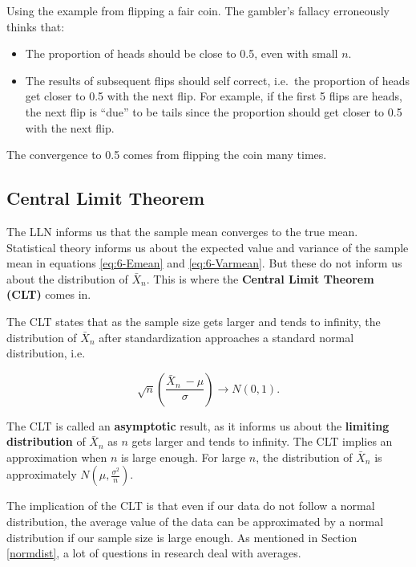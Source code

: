 \documentclass[
]{book}
\providecommand{\tightlist}{%
  \setlength{\itemsep}{0pt}\setlength{\parskip}{0pt}}
\begin{document}
Using the example from flipping a fair coin. The gambler's fallacy erroneously thinks that:

\begin{itemize}
\tightlist
\item
  The proportion of heads should be close to 0.5, even with small \(n\).
\item
  The results of subsequent flips should self correct, i.e.~the proportion of heads get closer to 0.5 with the next flip. For example, if the first 5 flips are heads, the next flip is ``due'' to be tails since the proportion should get closer to 0.5 with the next flip.
\end{itemize}

The convergence to 0.5 comes from flipping the coin many times.

\subsection{Central Limit Theorem}\label{CLT}

The LLN informs us that the sample mean converges to the true mean. Statistical theory informs us about the expected value and variance of the sample mean in equations \eqref{eq:6-Emean} and \eqref{eq:6-Varmean}. But these do not inform us about the distribution of \(\bar{X}_n\). This is where the \textbf{Central Limit Theorem (CLT)} comes in.

The CLT states that as the sample size gets larger and tends to infinity, the distribution of \(\bar{X}_n\) after standardization approaches a standard normal distribution, i.e.

\begin{equation} 
\sqrt{n} \left(\frac{\bar{X}_n \ - \mu}{\sigma} \right) \to N(0,1).
\label{eq:6-CLT}
\end{equation}

The CLT is called an \textbf{asymptotic} result, as it informs us about the \textbf{limiting distribution} of \(\bar{X}_n\) as \(n\) gets larger and tends to infinity. The CLT implies an approximation when \(n\) is large enough. For large \(n\), the distribution of \(\bar{X}_n\) is approximately \(N(\mu, \frac{\sigma^2}{n})\).

The implication of the CLT is that even if our data do not follow a normal distribution, the average value of the data can be approximated by a normal distribution if our sample size is large enough. As mentioned in Section \ref{normdist}, a lot of questions in research deal with averages.
\end{document}
